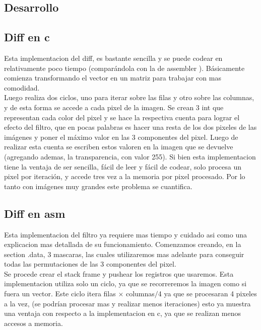 \subsection{Desarrollo}

\subsection{Diff en c}

Esta implementacion del diff, es bastante sencilla y se puede codear en relativamente poco tiempo (comparándola con la de assembler ). Básicamente comienza transformando el vector en un matriz para trabajar con mas comodidad. \\
Luego realiza dos ciclos, uno para iterar sobre las filas y otro sobre las columnas, y de esta forma se accede a cada pixel de la imagen. Se crean 3 int que representan cada color del pixel y se hace la respectiva cuenta para lograr el efecto del filtro, que en pocas palabras es hacer una resta de los dos pixeles de las imágenes y poner el máximo valor en las 3 componentes del pixel. Luego de realizar esta cuenta se escriben estos valoren en la imagen que se devuelve (agregando ademas, la transparencia, con valor 255). Si bien esta implementacion tiene la ventaja de ser sencilla, fácil de leer y fácil de codear, solo procesa un pixel por iteración, y accede tres vez a la memoria por pixel procesado. Por lo tanto con imágenes muy grandes este problema se cuantifica.
 
\subsection{Diff en asm}

Esta implementacion del filtro ya requiere mas tiempo y cuidado asi como una explicacion mas detallada de su funcionamiento. Comenzamos creando, en la section .data, 3 mascaras, las cuales utilizaremos mas adelante para conseguir todas las permutaciones de las 3 componentes del pixel. \\
Se procede crear el stack frame y pushear los registros que usaremos. Esta implementacion utiliza solo un ciclo, ya que se recorreremos la imagen como si fuera un vector. Este ciclo itera filas $\times$ columnas$/$4  ya que se procesaran 4 pixeles a la vez, (se podrían procesar mas y realizar menos iteraciones) esto ya muestra una ventaja con respecto a la implementacion en c, ya que se realizan menos accesos a memoria. \\

